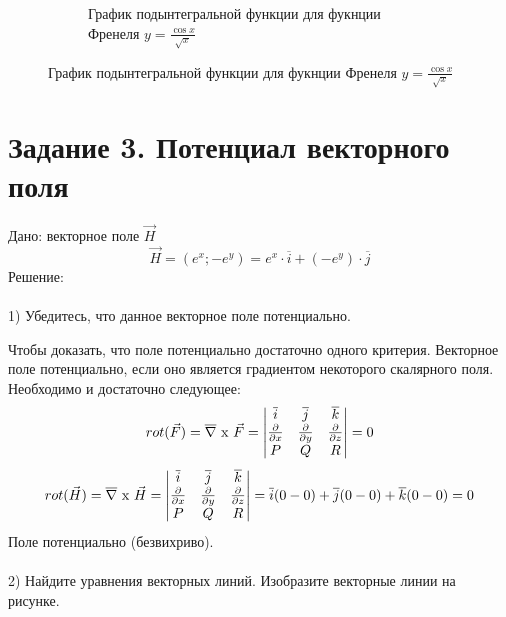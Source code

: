 \documentclass{article}
\begin{document}
\begin{figure}[H]
\begin{minipage}[t]{.4\textwidth}
\begin{figure}[H]
  \caption{График подынтегральной функции для фукнции Френеля $y =  \frac{\cos{x}}{\sqrt{x}}$}
  \label{fig:fren2_fun}
    \end{figure}
\end{minipage}
\end{figure}

\newpage
\section*{Задание 3. Потенциал векторного поля}
Дано: векторное поле $\vec{H}$
\begin{equation*}
    \vec{H} = (e^x;-e^{y}) = e^x\cdot \overline{i}+(-e^y)\cdot\overline{j}
\end{equation*}
Решение:
\\ \\
1) Убедитесь, что данное векторное поле потенциально.

Чтобы доказать, что поле потенциально достаточно одного критерия. Векторное поле потенциально, если оно является градиентом некоторого скалярного поля. 
Необходимо и достаточно следующее:
\begin{equation*}
    rot(\vec{F}) = \overline{\nabla}\text{ x }\vec{F} = 
    \begin{vmatrix}
        \overline{i}&\overline{j}&\overline{k}\\
        \pdv{}{x}&\pdv{}{y}&\pdv{}{z}\\
        P&Q&R\\
    \end{vmatrix}
    = 0
\end{equation*}
\begin{equation*}
    rot(\vec{H}) = \overline{\nabla}\text{ x }\vec{H} = 
    \begin{vmatrix}
        \overline{i}&\overline{j}&\overline{k}\\
        \pdv{}{x}&\pdv{}{y}&\pdv{}{z}\\
        P&Q&R\\
    \end{vmatrix}
    = \overline{i}(0-0) + \overline{j}(0-0) + \overline{k}(0-0)
    = 0
\end{equation*}
Поле потенциально (безвихриво).
\\
\\
2) Найдите уравнения векторных линий. Изобразите векторные линии на рисунке.
\end{document}
